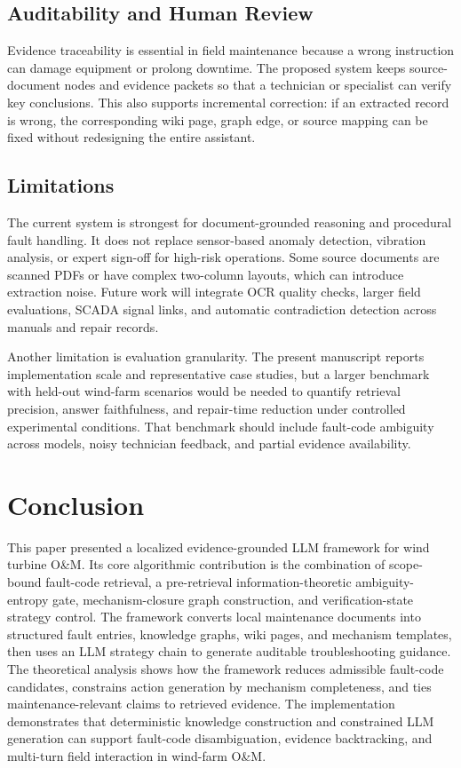\documentclass[lettersize,journal]{IEEEtran}
\begin{document}
\subsection{Auditability and Human Review}
Evidence traceability is essential in field maintenance because a wrong instruction can damage equipment or prolong downtime. The proposed system keeps source-document nodes and evidence packets so that a technician or specialist can verify key conclusions. This also supports incremental correction: if an extracted record is wrong, the corresponding wiki page, graph edge, or source mapping can be fixed without redesigning the entire assistant.

\subsection{Limitations}
The current system is strongest for document-grounded reasoning and procedural fault handling. It does not replace sensor-based anomaly detection, vibration analysis, or expert sign-off for high-risk operations. Some source documents are scanned PDFs or have complex two-column layouts, which can introduce extraction noise. Future work will integrate OCR quality checks, larger field evaluations, SCADA signal links, and automatic contradiction detection across manuals and repair records.

Another limitation is evaluation granularity. The present manuscript reports implementation scale and representative case studies, but a larger benchmark with held-out wind-farm scenarios would be needed to quantify retrieval precision, answer faithfulness, and repair-time reduction under controlled experimental conditions. That benchmark should include fault-code ambiguity across models, noisy technician feedback, and partial evidence availability.

\section{Conclusion}
This paper presented a localized evidence-grounded LLM framework for wind turbine O\&M. Its core algorithmic contribution is the combination of scope-bound fault-code retrieval, a pre-retrieval information-theoretic ambiguity-entropy gate, mechanism-closure graph construction, and verification-state strategy control. The framework converts local maintenance documents into structured fault entries, knowledge graphs, wiki pages, and mechanism templates, then uses an LLM strategy chain to generate auditable troubleshooting guidance. The theoretical analysis shows how the framework reduces admissible fault-code candidates, constrains action generation by mechanism completeness, and ties maintenance-relevant claims to retrieved evidence. The implementation demonstrates that deterministic knowledge construction and constrained LLM generation can support fault-code disambiguation, evidence backtracking, and multi-turn field interaction in wind-farm O\&M.
\end{document}

